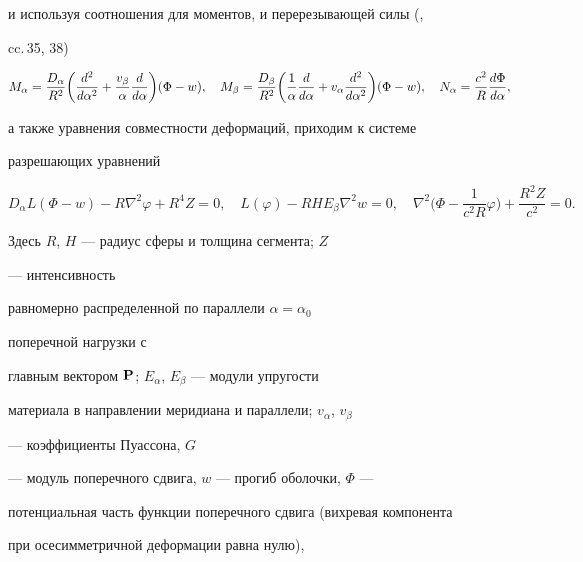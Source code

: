 и используя соотношения для моментов, и перерезывающей силы (\cite{2}, 


cc.\,35, 38) 


\begin{equation} 


M_\alpha=\frac{D_\alpha}{R^2}\bigg( 


\myfrac{^2}{^2}+\frac{v_\beta}{\alpha}\myfrac{}{}\bigg) 


(\Phi-w),\quad M_\beta=\frac{D_\beta}{R^2}\bigg( 


\frac{1}{\alpha}\myfrac{}{}+v_\alpha\myfrac{^2}{^2}\bigg) 


(\Phi-w),\quad N_\alpha=\frac{c^2}{R}\myfrac{\Phi}{}, 


\end{equation} 


а также уравнения совместности деформаций, приходим к системе 


разрешающих уравнений 


\begin{equation} 


D_\alpha L(\Phi-w)-R\nabla^2\varphi+R^4Z=0,\quad 


L(\varphi)-R H E_\beta\nabla^2w=0,\quad 


\nabla^2\bigg(\Phi-\frac{1}{c^2R}\varphi\bigg)+ 


\frac{R^2Z}{c^2}=0. 


\end{equation} 


Здесь $R$, $H$ --- радиус сферы и толщина сегмента; $Z$ 


--- интенсивность 


равномерно распределенной по параллели $\alpha=\alpha_0$ 


поперечной нагрузки с 


главным вектором $\bold P$; $E_\alpha$, $E_\beta$ --- модули упругости 


материала в направлении меридиана и параллели; $v_\alpha$, $v_\beta$ 


--- коэффициенты Пуассона, $G$ 


--- модуль поперечного сдвига, $w$ --- прогиб оболочки, $\Phi$ --- 


потенциальная часть функции поперечного сдвига (вихревая компонента 


при осесимметричной деформации равна нулю), 


